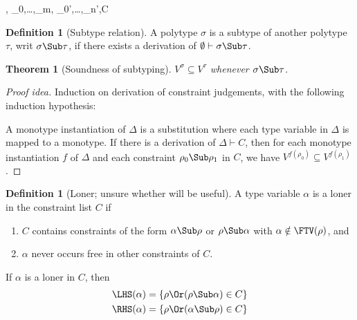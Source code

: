 \documentclass{amsart}
\newtheorem{theorem}[subsection]{Theorem}
\theoremstyle{definition}
\newtheorem{definition}[subsection]{Definition}
\begin{document}
{
\Delta,\alpha \vdash
\rho_0\Sub\alpha,\ldots,\rho_m\Sub\alpha,
\alpha\Sub\rho_0',\ldots,\alpha\Sub\rho_n',C
}

\begin{definition}
[Subtype relation]
A polytype $\sigma$ is a subtype of another polytype $\tau$, writ
$\sigma \Sub \tau$, if there exists a derivation of
$\emptyset\vdash\sigma\Sub\tau$.
\end{definition}

\begin{theorem}
[Soundness of subtyping]
\label{subsound}
$V^\sigma\subseteq V^\tau$ whenever $\sigma\Sub\tau$.
\end{theorem}

\begin{proof}[Proof idea]
Induction on derivation of constraint judgements, with the
following induction hypothesis:

A monotype instantiation of $\Delta$ is a substitution where each
type variable in $\Delta$ is mapped to a monotype. If there is a
derivation of $\Delta\vdash C$, then for each monotype
instantiation $f$ of $\Delta$ and each constraint
$\rho_0\Sub\rho_1$ in $C$, we have $V^{f(\rho_0)}\subseteq
V^{f(\rho_1)}$.
\end{proof}

\begin{definition}
[Loner; unsure whether will be useful]
\label{loner}
A type variable $\alpha$ is a loner in the constraint list $C$ if
\begin{enumerate}
\item $C$ contains constraints of the form
$\alpha\Sub\rho$ or $\rho\Sub\alpha$ with
$\alpha\notin\FTV(\rho)$, and
\item $\alpha$ never occurs free in other constraints of $C$.
\end{enumerate}
If $\alpha$ is a loner in $C$, then
\begin{align*}
\LHS(\alpha)&=\{\rho \Or (\rho\Sub\alpha) \in C\}\\
\RHS(\alpha)&=\{\rho \Or (\alpha\Sub\rho) \in C\}\\
\end{align*}
\end{definition}




\end{document}
